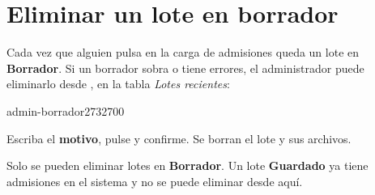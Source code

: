 \section{Eliminar un lote en borrador}

Cada vez que alguien pulsa  en la carga de admisiones queda un lote en
\textbf{Borrador}. Si un borrador sobra o tiene errores, el administrador puede eliminarlo desde
, en la tabla \emph{Lotes
recientes}:

\begin{captura}{admin-borrador}{2732}{700}
\end{captura}

\begin{leyenda}
  \item[1] Escriba el \textbf{motivo}, pulse  y confirme. Se borran el lote y
        sus archivos.
\end{leyenda}

\begin{nota}
Solo se pueden eliminar lotes en \textbf{Borrador}. Un lote \textbf{Guardado} ya tiene
admisiones en el sistema y no se puede eliminar desde aquí.
\end{nota}
